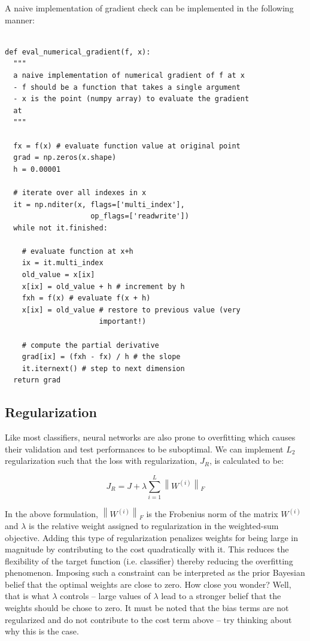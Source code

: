 \documentclass{tufte-handout}
\newcommand{\norm}[1]{\left\lVert#1\right\rVert}
\begin{document}
A naive implementation of gradient check can be implemented in the following manner:
\begin{theorem}
\begin{verbatim}

def eval_numerical_gradient(f, x):
  """ 
  a naive implementation of numerical gradient of f at x 
  - f should be a function that takes a single argument
  - x is the point (numpy array) to evaluate the gradient 
  at
  """ 

  fx = f(x) # evaluate function value at original point
  grad = np.zeros(x.shape)
  h = 0.00001

  # iterate over all indexes in x
  it = np.nditer(x, flags=['multi_index'], 
  	                op_flags=['readwrite'])
  while not it.finished:

    # evaluate function at x+h
    ix = it.multi_index
    old_value = x[ix]
    x[ix] = old_value + h # increment by h
    fxh = f(x) # evaluate f(x + h)
    x[ix] = old_value # restore to previous value (very 
    			      important!)

    # compute the partial derivative
    grad[ix] = (fxh - fx) / h # the slope
    it.iternext() # step to next dimension
  return grad  
\end{verbatim}
\label{snip:gradcheck}
\end{theorem}
\subsection{Regularization}

Like most classifiers, neural networks are also prone to overfitting which causes their validation and test performances to be suboptimal. We can implement $L_2$ regularization such that the loss with regularization, $J_R$, is calculated to be:

$$J_R = J + \lambda \sum_{i = 1}^{L} \norm{W^{(i)}}_F$$

In the above formulation, $\norm{W^{(i)}}_F$ is the Frobenius norm of the matrix $W^{(i)}$ and $\lambda$ is the relative weight assigned to regularization in the weighted-sum objective. Adding this type of regularization penalizes weights for being large in magnitude by contributing to the cost quadratically with it. This reduces the flexibility of the target function (i.e. classifier) thereby reducing the overfitting phenomenon. Imposing such a constraint can be interpreted as the prior Bayesian belief that the optimal weights are close to zero. How close you wonder? Well, that is what $\lambda$ controls -- large values of $\lambda$ lead to a stronger belief that the weights should be chose to zero. It must be noted that the bias terms are not regularized and do not contribute to the cost term above -- try thinking about why this is the case.
\end{document}
